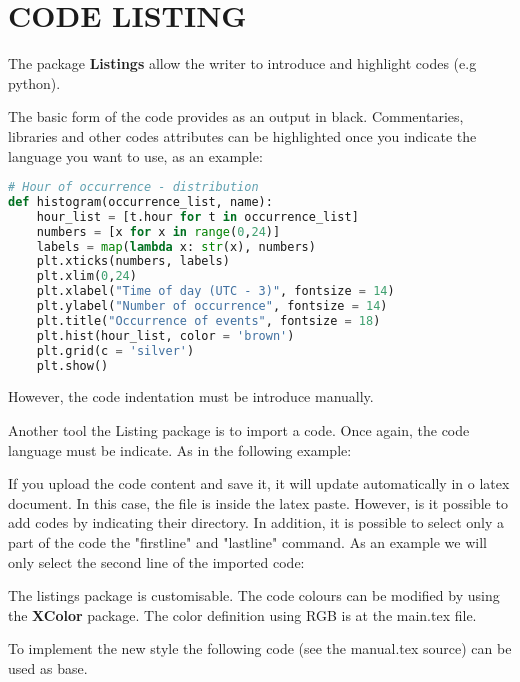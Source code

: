 \section{CODE LISTING}

 
The package \textbf{Listings} allow the writer to introduce and highlight codes (e.g python).

The basic form of the code provides as an output in black. Commentaries, libraries and other codes attributes can be highlighted once you indicate the language you want to use, as an example:

\begin{lstlisting}[language=Python]
# Hour of occurrence - distribution
def histogram(occurrence_list, name):
	hour_list = [t.hour for t in occurrence_list]
	numbers = [x for x in range(0,24)]
	labels = map(lambda x: str(x), numbers)
	plt.xticks(numbers, labels)
	plt.xlim(0,24)
	plt.xlabel("Time of day (UTC - 3)", fontsize = 14)
	plt.ylabel("Number of occurrence", fontsize = 14)
	plt.title("Occurrence of events", fontsize = 18)
	plt.hist(hour_list, color = 'brown')
	plt.grid(c = 'silver')
	plt.show()	
\end{lstlisting}

However, the code indentation must be introduce manually.

Another tool the Listing package is to import a code. Once again, the code language must be indicate. As in the following example:



If you upload the code content and save it, it will update automatically in o latex document. In this case, the file is inside the latex paste. However, is it possible to add codes by indicating their directory. In addition, it is possible to select only a part of the code the "firstline" and "lastline" command. As an example we will only select the second line of the imported code:



The listings package is customisable. The code colours can be modified by using the \textbf{XColor} package. The color definition using RGB is at the main.tex file.

To implement the new style the following code (see the manual.tex source) can be used as base.


